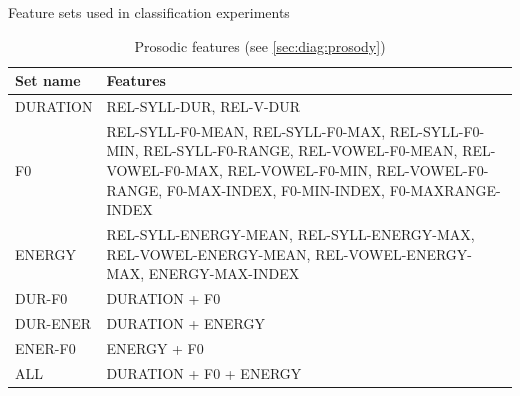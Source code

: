 		
		\begin{table}
			\centering
			\caption[Feature sets used in classification experiments]{Feature sets used in classification experiments }
			
			\begin{subtable}[h]{\textwidth}
				\centering
				\caption{Prosodic features (see \cref{sec:diag:prosody})}
				\begin{tabularx}{.65\textwidth}{lX}
				\toprule
				Set name & Features \\
				\midrule
				DURATION & 	REL-SYLL-DUR, REL-V-DUR \\
				\addlinespace
				F0 &	REL-SYLL-F0-MEAN,\newline
						REL-SYLL-F0-MAX, \newline
						REL-SYLL-F0-MIN, \newline
						REL-SYLL-F0-RANGE, \newline
						REL-VOWEL-F0-MEAN, \newline
						REL-VOWEL-F0-MAX, \newline
						REL-VOWEL-F0-MIN, \newline
						REL-VOWEL-F0-RANGE, \newline
						F0-MAX-INDEX, \newline
						F0-MIN-INDEX, \newline
						F0-MAXRANGE-INDEX \\
				\addlinespace
				ENERGY &	REL-SYLL-ENERGY-MEAN, \newline
								REL-SYLL-ENERGY-MAX, \newline
								REL-VOWEL-ENERGY-MEAN, \newline
								REL-VOWEL-ENERGY-MAX, \newline
								ENERGY-MAX-INDEX \\
				\addlinespace
				DUR-F0 & DURATION + F0 \\
				DUR-ENER & DURATION + ENERGY \\
				ENER-F0 & ENERGY + F0 \\
				ALL & DURATION + F0 + ENERGY \\
				\bottomrule
				\end{tabularx}
				\label{tab:features:sets:prosody}
			\end{subtable}
			
			\vspace{1.5em}			
			

\end{table}
